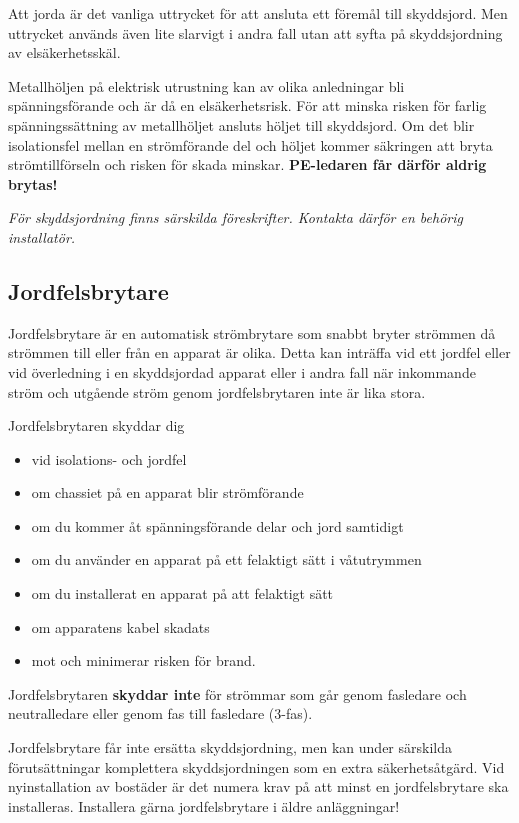 Att jorda är det vanliga uttrycket för att ansluta ett föremål till skyddsjord.
Men uttrycket används även lite slarvigt i andra fall utan att syfta på
skyddsjordning av elsäkerhetsskäl.

Metallhöljen på elektrisk utrustning kan av olika anledningar bli
spänningsförande och är då en elsäkerhetsrisk.
För att minska risken för farlig spänningssättning av metallhöljet ansluts
höljet till skyddsjord.
Om det blir isolationsfel mellan en strömförande del och höljet kommer
säkringen att bryta strömtillförseln och risken för skada minskar.
\textbf{PE-ledaren får därför aldrig brytas!}

\emph{För skyddsjordning finns särskilda föreskrifter.
  Kontakta därför en behörig installatör.}

\subsection{Jordfelsbrytare}

Jordfelsbrytare är en automatisk strömbrytare som snabbt bryter strömmen
då strömmen till eller från en apparat är olika.
Detta kan inträffa vid ett jordfel eller vid överledning i en skyddsjordad
apparat eller i andra fall när inkommande ström och utgående ström genom
jordfelsbrytaren inte är lika stora.

Jordfelsbrytaren skyddar dig
\begin{itemize}
\item vid isolations- och jordfel
\item om chassiet på en apparat blir strömförande
\item om du kommer åt spänningsförande delar och jord samtidigt
\item om du använder en apparat på ett felaktigt sätt i våtutrymmen
\item om du installerat en apparat på att felaktigt sätt
\item om apparatens kabel skadats
\item mot och minimerar risken för brand.
\end{itemize}

Jordfelsbrytaren \textbf{skyddar inte} för strömmar som går genom fasledare
och neutralledare eller genom fas till fasledare (3-fas).

Jordfelsbrytare får inte ersätta skyddsjordning, men kan under särskilda
förutsättningar komplettera skyddsjordningen som en extra säkerhetsåtgärd.
Vid nyinstallation av bostäder är det numera krav på att minst en
jordfelsbrytare ska installeras.
Installera gärna jordfelsbrytare i äldre anläggningar!

